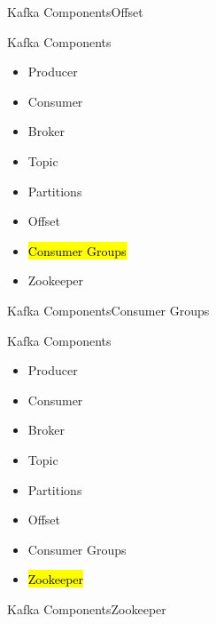 \documentclass{beamer}
\begin{document}
\begin{frame}{Kafka Components}{Offset}

\end{frame}

\begin{frame}{Kafka Components}
  \begin{itemize}
    \item Producer
    \item Consumer
    \item Broker
    \item Topic
    \item Partitions
    \item Offset
    \item \hl{Consumer Groups}
    \item Zookeeper
  \end{itemize}
\end{frame}

\begin{frame}{Kafka Components}{Consumer Groups}

\end{frame}

\begin{frame}{Kafka Components}
  \begin{itemize}
    \item Producer
    \item Consumer
    \item Broker
    \item Topic
    \item Partitions
    \item Offset
    \item Consumer Groups
    \item \hl{Zookeeper}
  \end{itemize}
\end{frame}

\begin{frame}{Kafka Components}{Zookeeper}

\end{frame}
\end{document}
